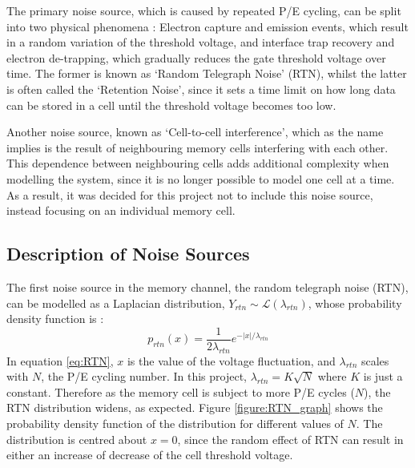 \documentclass[11pt]{article}
\numberwithin{equation}{subsection}
\begin{document}
The primary noise source, which is caused by repeated P/E cycling, can be split into two physical phenomena \cite{dong2012estimating}: Electron capture and emission events, which result in a random variation of the threshold voltage, and interface trap recovery and electron de-trapping, which gradually reduces the gate threshold voltage over time. The former is known as `Random Telegraph Noise' (RTN), whilst the latter is often called the `Retention Noise', since it sets a time limit on how long data can be stored in a cell until the threshold voltage becomes too low.

Another noise source, known as `Cell-to-cell interference', which as the name implies is the result of neighbouring memory cells interfering with each other. This dependence between neighbouring cells adds additional complexity when modelling the system, since it is no longer possible to model one cell at a time. As a result, it was decided for this project not to include this noise source, instead focusing on an individual memory cell.

\subsection{Description of Noise Sources}

The first noise source in the memory channel, the random telegraph noise (RTN), can be modelled as a Laplacian distribution, $Y_{rtn} \sim \mathcal{L}(\lambda_{rtn})$, whose probability density function is \cite{dong2012estimating}:
\begin{equation} \label{eq:RTN}
p_{rtn}(x) = \dfrac{1}{2\lambda_{rtn}}e^{-\lvert x \rvert / \lambda_{rtn}}
\end{equation}
In equation \ref{eq:RTN}, $x$ is the value of the voltage fluctuation, and $\lambda_{rtn}$ scales with $N$, the P/E cycling number. In this project, $\lambda_{rtn} = K \sqrt{N}$ where $K$ is just a constant. Therefore as the memory cell is subject to more P/E cycles ($N$), the RTN distribution widens, as expected. Figure \ref{figure:RTN_graph} shows the probability density function of the distribution for different values of $N$. The distribution is centred about $x=0$, since the random effect of RTN can result in either an increase of decrease of the cell threshold voltage.
\end{document}
